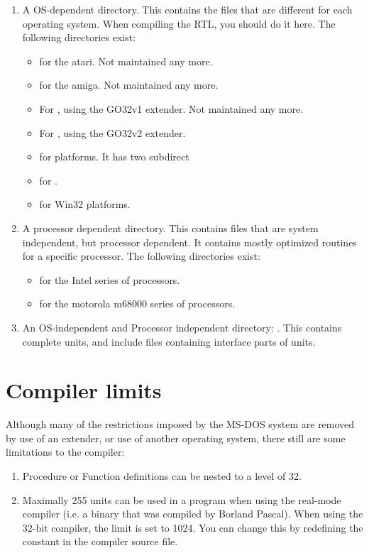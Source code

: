 \begin{enumerate}
\item A OS-dependent directory. This contains the files that are different for
each operating system. When compiling the RTL, you should do it here. The
following directories exist:
\begin{itemize}
\item {} for the atari. Not maintained any more.
\item {} for the amiga.  Not maintained any more.
\item {} For \dos, using the GO32v1 extender. Not maintained any
more.
\item {} For \dos, using the GO32v2 extender.
\item {} for \linux platforms. It has two subdirect
\item {} for \ostwo.
\item {} for Win32 platforms.
\end{itemize}
\item A processor dependent directory. This contains files that are system
independent, but processor dependent. It contains mostly optimized routines
for a specific processor. The following directories exist:
\begin{itemize}
\item {} for the Intel series of processors.
\item {} for the motorola m68000 series of processors.
\end{itemize}
\item An OS-independent and Processor independent directory: . This
contains complete units, and include files containing interface parts of
units.
\end{enumerate}


\chapter{Compiler limits}
\label{ch:AppC}
Although many of the restrictions imposed by the MS-DOS system are removed
by use of an extender, or use of another operating system, there still are
some limitations to the compiler:
\begin{enumerate}
\item Procedure or Function definitions can be nested to a level of 32.
\item Maximally 255 units can be used in a program when using the real-mode
compiler (i.e. a binary that was compiled by Borland Pascal). When using the 32-bit compiler, the limit is set to 1024. You can
change this by redefining the  constant in the
 compiler source file.
\end{enumerate}


